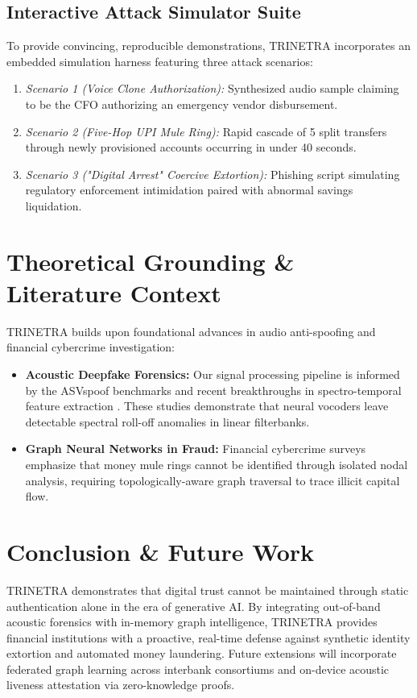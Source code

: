 \documentclass[10pt,journal,compsoc]{IEEEtran}
\begin{document}
\subsection{Interactive Attack Simulator Suite}
To provide convincing, reproducible demonstrations, TRINETRA incorporates an embedded simulation harness featuring three attack scenarios:
\begin{enumerate}
    \item \textit{Scenario 1 (Voice Clone Authorization):} Synthesized audio sample claiming to be the CFO authorizing an emergency vendor disbursement.
    \item \textit{Scenario 2 (Five-Hop UPI Mule Ring):} Rapid cascade of 5 split transfers through newly provisioned accounts occurring in under 40 seconds.
    \item \textit{Scenario 3 ("Digital Arrest" Coercive Extortion):} Phishing script simulating regulatory enforcement intimidation paired with abnormal savings liquidation.
\end{enumerate}

\section{Theoretical Grounding \& Literature Context}
\label{sec:literature}
TRINETRA builds upon foundational advances in audio anti-spoofing and financial cybercrime investigation:
\begin{itemize}
    \item \textbf{Acoustic Deepfake Forensics:} Our signal processing pipeline is informed by the ASVspoof benchmarks and recent breakthroughs in spectro-temporal feature extraction \cite{tak2021endtoend, muller2022does}. These studies demonstrate that neural vocoders leave detectable spectral roll-off anomalies in linear filterbanks.
    \item \textbf{Graph Neural Networks in Fraud:} Financial cybercrime surveys \cite{albakri2021financial} emphasize that money mule rings cannot be identified through isolated nodal analysis, requiring topologically-aware graph traversal to trace illicit capital flow.
\end{itemize}

\section{Conclusion \& Future Work}
\label{sec:conclusion}
TRINETRA demonstrates that digital trust cannot be maintained through static authentication alone in the era of generative AI. By integrating out-of-band acoustic forensics with in-memory graph intelligence, TRINETRA provides financial institutions with a proactive, real-time defense against synthetic identity extortion and automated money laundering. Future extensions will incorporate federated graph learning across interbank consortiums and on-device acoustic liveness attestation via zero-knowledge proofs.
\end{document}
